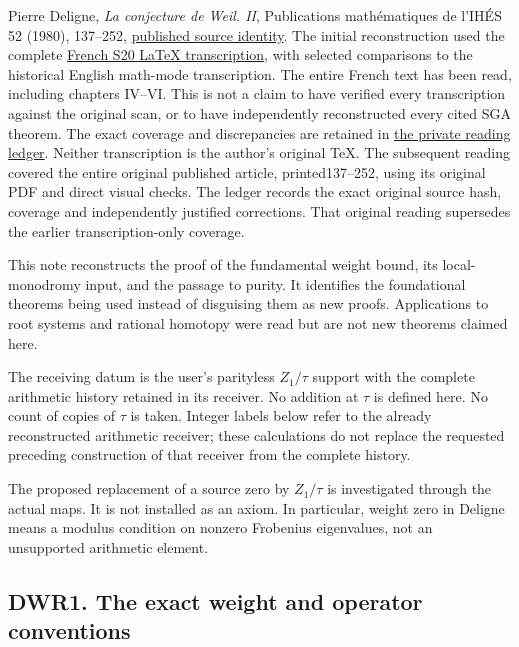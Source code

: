 Pierre Deligne, \emph{La conjecture de Weil. II}, Publications
mathématiques de l'IHÉS 52 (1980), 137--252,
\href{https://numdam.org/item/PMIHES_1980__52__137_0/}{published source
identity}. The initial reconstruction used the complete
\href{https://github.com/KokunoYumeto/zeta-function-research-reader/blob/main/workbenches/splitzero-tandem/continuations/20260925-source-endpoint-and-section/PUBLICATION_NOTES.md#source-reading-record}{French
S20 LaTeX transcription}, with selected comparisons to the historical
English math-mode transcription. The entire French text has been read,
including chapters IV--VI. This is not a claim to have verified every
transcription against the original scan, or to have independently
reconstructed every cited SGA theorem. The exact coverage and
discrepancies are retained in
\href{https://github.com/KokunoYumeto/zeta-function-research-reader/blob/main/workbenches/splitzero-tandem/continuations/20260925-source-endpoint-and-section/PUBLICATION_NOTES.md#source-reading-record}{the private
reading ledger}. Neither transcription is the author's original TeX. The
subsequent reading covered the entire original published article,
printed137--252, using its original PDF and direct visual checks. The
ledger records the exact original source hash, coverage and
independently justified corrections. That original reading supersedes
the earlier transcription-only coverage.

This note reconstructs the proof of the fundamental weight bound, its
local-monodromy input, and the passage to purity. It identifies the
foundational theorems being used instead of disguising them as new
proofs. Applications to root systems and rational homotopy were read but
are not new theorems claimed here.

The receiving datum is the user's parityless \(Z_1/\tau\) support with
the complete arithmetic history retained in its receiver. No addition at
\(\tau\) is defined here. No count of copies of \(\tau\) is taken.
Integer labels below refer to the already reconstructed arithmetic
receiver; these calculations do not replace the requested preceding
construction of that receiver from the complete history.

The proposed replacement of a source zero by \(Z_1/\tau\) is
investigated through the actual maps. It is not installed as an axiom.
In particular, weight zero in Deligne means a modulus condition on
nonzero Frobenius eigenvalues, not an unsupported arithmetic element.

\subsection{DWR1. The exact weight and operator
conventions}\label{dwr1.-the-exact-weight-and-operator-conventions}

